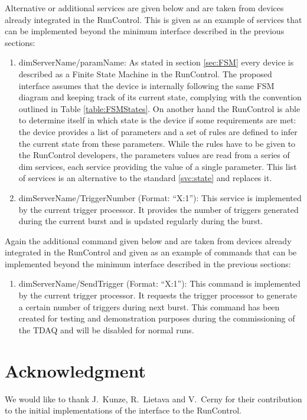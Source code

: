 \documentclass[a4paper]{article}
\begin{document}
Alternative or additional services are given below and are taken from devices
already integrated in the RunControl. This is given as an example of services
that can be implemented beyond the minimum interface described in the previous
sections:
\begin{enumerate}[label=\textbf{ASVC.\arabic*}]
	\item \label{svc:stateParams} dimServerName/paramName: As stated in section
	\ref{sec:FSM} every device is described as a Finite State Machine in
	the RunControl. The proposed interface assumes that the device is internally
	following the same FSM diagram and keeping track of its current state,
	complying with the convention outlined in Table \ref{table:FSMStates}. On
	another hand the RunControl is able to determine itself in which state is the
	device if some requirements are met: the device provides a list of parameters
	and a set of rules are defined to infer the current state from these
	parameters.
	While the rules have to be given to the RunControl developers, the
	parameters values are read from a series of dim services, each service
	providing the value of a single parameter. This list of services is an
	alternative to the standard \ref{svc:state} and replaces it.
	\item dimServerName/TriggerNumber (Format: ``X:1''): This service is
	implemented by the current trigger processor. It provides the number of
	triggers generated during the current burst and is updated regularly during
	the burst.
\end{enumerate}

Again the additional command given below and are taken from devices already
integrated in the RunControl and given as an example of commands that can be
implemented beyond the minimum interface described in the previous sections:
\begin{enumerate}[label=\textbf{ACMD.\arabic*}]
	\item dimServerName/SendTrigger (Format: ``X:1''): This command is
	implemented by the current trigger processor. It requests the trigger processor
	to generate a certain number of triggers during next burst. This command has
	been created for testing and demonstration purposes during the commissioning of
	the TDAQ and will be disabled for normal runs.
\end{enumerate}

\section{Acknowledgment}
We would like to thank J.~Kunze, R.~Lietava and V.~Cerny for their contribution to the initial
implementations of the interface to the RunControl.
\end{document}
